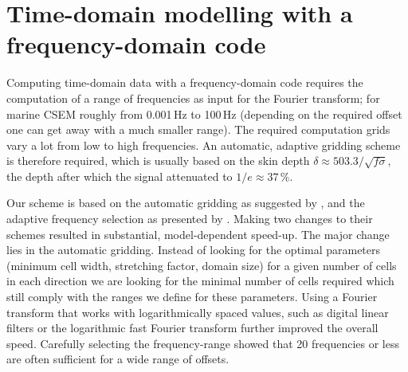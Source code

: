 \documentclass{eage2020}
\begin{document}
\section{Time-domain modelling with a frequency-domain code}

Computing time-domain data with a frequency-domain code requires the
computation of a range of frequencies as input for the Fourier transform; for
marine CSEM roughly from 0.001\,Hz to 100\,Hz (depending on the required offset
one can get away with a much smaller range). The required computation grids
vary a lot from low to high frequencies. An automatic, adaptive gridding scheme
is therefore required, which is usually based on the skin depth
$\delta\approx503.3/\sqrt{f\sigma}$, the depth after which the signal
attenuated to $1/e\approx 37\,\%$.

Our scheme is based on the automatic gridding as suggested by
\cite{GEO.07.Plessix}, and the adaptive frequency selection as presented by
\cite{GEO.08.Mulder}. Making two changes to their schemes resulted in
substantial, model-dependent speed-up. The major change lies in the automatic
gridding. Instead of looking for the optimal parameters (minimum cell width,
stretching factor, domain size) for a given number of cells in each direction
we are looking for the minimal number of cells required which still comply with
the ranges we define for these parameters. Using a Fourier transform that works
with logarithmically spaced values, such as digital linear filters \citep[DLF,
][]{GP.71.Ghosh} or the logarithmic fast Fourier transform \citep[FFTLog,
][]{RAS.00.Hamilton} further improved the overall speed. Carefully selecting
the frequency-range showed that 20 frequencies or less are often sufficient for
a wide range of offsets.
\end{document}
